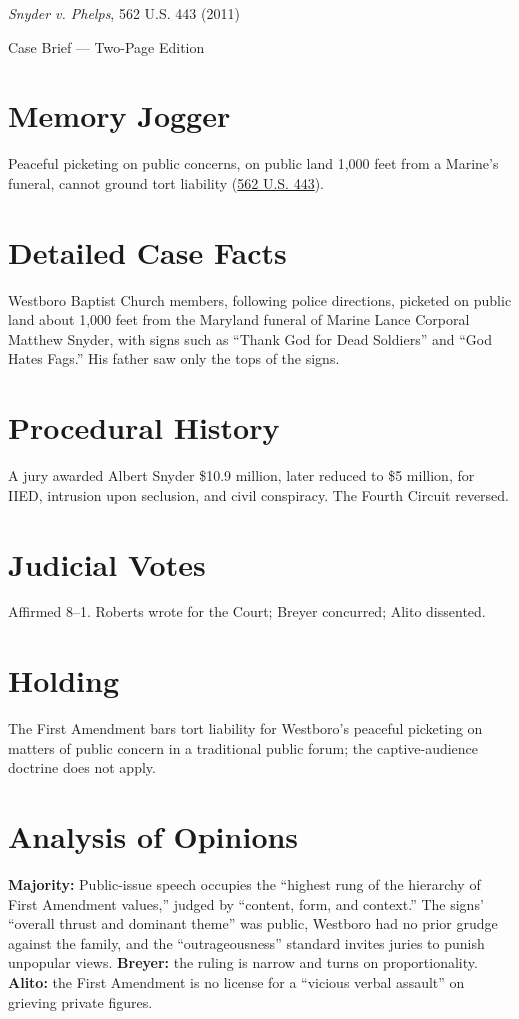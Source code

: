 \documentclass[12pt]{article}
\begin{document}
\begin{center}
{\LARGE \textit{Snyder v. Phelps}, 562 U.S. 443 (2011)\par}
\vspace{0.5em}
{\large Case Brief --- Two-Page Edition\par}
\end{center}

\section{Memory Jogger}
Peaceful picketing on public concerns, on public land 1,000 feet from a Marine's funeral, cannot ground tort liability (\href{https://supreme.justia.com/cases/federal/us/562/443/}{562 U.S. 443}).

\section{Detailed Case Facts}
Westboro Baptist Church members, following police directions, picketed on public land about 1,000 feet from the Maryland funeral of Marine Lance Corporal Matthew Snyder, with signs such as ``Thank God for Dead Soldiers'' and ``God Hates Fags.'' His father saw only the tops of the signs.

\section{Procedural History}
A jury awarded Albert Snyder \$10.9 million, later reduced to \$5 million, for IIED, intrusion upon seclusion, and civil conspiracy. The Fourth Circuit reversed.

\section{Judicial Votes}
Affirmed 8--1. Roberts wrote for the Court; Breyer concurred; Alito dissented.

\section{Holding}
The First Amendment bars tort liability for Westboro's peaceful picketing on matters of public concern in a traditional public forum; the captive-audience doctrine does not apply.

\section{Analysis of Opinions}
\textbf{Majority:} Public-issue speech occupies the ``highest rung of the hierarchy of First Amendment values,'' judged by ``content, form, and context.'' The signs' ``overall thrust and dominant theme'' was public, Westboro had no prior grudge against the family, and the ``outrageousness'' standard invites juries to punish unpopular views. \textbf{Breyer:} the ruling is narrow and turns on proportionality. \textbf{Alito:} the First Amendment is no license for a ``vicious verbal assault'' on grieving private figures.
\end{document}
